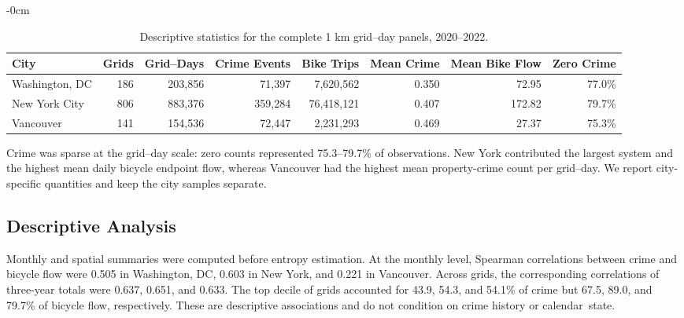 \documentclass[applsci,article,accept,moreauthors]{Definitions/mdpi}
\def\hl#1{#1}%
\begin{document}
\begin{table}[H]
\caption{\hl{Descriptive} %
 statistics for the complete 1 km grid--day panels, 2020--2022.}
\label{tab:descriptive_statistics}
\begin{adjustwidth}{-\extralength}{0cm}
\raggedleft
\begin{tabular*}{\linewidth}{@{\extracolsep{\fill}}lrrrrrrr@{}}
\toprule
\textbf{City} & \textbf{Grids} & \textbf{Grid--Days} &
\textbf{Crime Events} & \textbf{Bike Trips} &
\textbf{Mean Crime} & \textbf{Mean Bike Flow} & \textbf{Zero Crime}\\
\midrule
Washington, DC & 186 & 203,856 & 71,397 & 7,620,562 & 0.350 & 72.95 & 77.0\%\\
New York City & 806 & 883,376 & 359,284 & 76,418,121 & 0.407 & 172.82 & 79.7\%\\
Vancouver & 141 & 154,536 & 72,447 & 2,231,293 & 0.469 & 27.37 & 75.3\%\\
\bottomrule
\end{tabular*}
\end{adjustwidth}
\end{table}


Crime was sparse at the grid--day scale: zero counts represented
75.3--79.7\% of observations. New York contributed the largest system and
the highest mean daily bicycle endpoint flow, whereas Vancouver had the
highest mean property-crime count per grid--day. We report city-specific
quantities and keep the city samples separate.

\subsection{Descriptive Analysis}
\label{subsec:descriptive_analysis}

Monthly and spatial summaries were computed before entropy estimation. At
the monthly level, Spearman correlations between crime and bicycle flow
were 0.505 in Washington, DC, 0.603 in New York, and 0.221 in Vancouver.
Across grids, the corresponding correlations of three-year totals were
0.637, 0.651, and 0.633. The top decile of grids accounted for 43.9, 54.3,
and 54.1\% of crime but 67.5, 89.0, and 79.7\% of bicycle flow,
respectively. These are descriptive associations and do not condition on
crime history or calendar~state.
\end{document}
